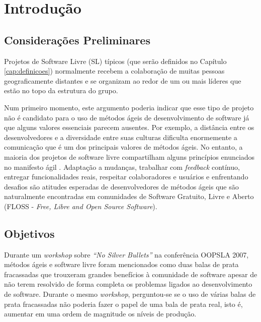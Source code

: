 \chapter{Introdução}
\label{cap:introducao}

\section{Considerações Preliminares}
\label{sec:consideracoes_preliminares}

Projetos de Software Livre (SL) típicos (que serão definidos no
Capítulo \ref{cap:definicoes}) normalmente recebem a colaboração de
muitas pessoas geograficamente distantes \cite{Dempsey1999} e se
organizam ao redor de um ou mais líderes que estão no topo da
estrutura do grupo.

Num primeiro momento, este argumento poderia indicar que esse tipo de
projeto não é candidato para o uso de métodos ágeis de desenvolvimento
de software já que alguns valores essenciais parecem ausentes. Por
exemplo, a distância entre os desenvolvedores e a diversidade entre
suas culturas dificulta enormemente a comunicação que é um dos
principais valores de métodos ágeis. No entanto, a maioria dos
projetos de software livre compartilham alguns princípios enunciados
no manifesto ágil \cite{AgileManifesto}. Adaptação a mudanças,
trabalhar com \emph{feedback} contínuo, entregar funcionalidades
reais, respeitar colaboradores e usuários e enfrentando desafios são
atitudes esperadas de desenvolvedores de métodos ágeis que são
naturalmente encontradas em comunidades de Software Gratuito, Livre e
Aberto (FLOSS - \emph{Free, Libre and Open Source Software}).


\section{Objetivos}
\label{sec:objetivo}

Durante um \emph{workshop} \cite{OOPSLA07} sobre \emph{``No Silver
  Bullets''} \cite{Brooks1987} na conferência OOPSLA 2007, métodos
ágeis e software livre foram mencionados como duas balas de prata
fracassadas que trouxeram grandes benefícios à comunidade de software
apesar de não terem resolvido de forma completa os problemas ligados
ao desenvolvimento de software. Durante o mesmo \emph{workshop},
perguntou-se se o uso de várias balas de prata fracassadas não poderia
fazer o papel de uma bala de prata real, isto é, aumentar em uma ordem
de magnitude os níveis de produção.

